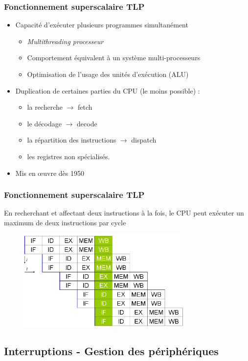 \begin{frame}
\frametitle{Fonctionnement superscalaire TLP}
\begin{itemize}
\item Capacité d'exécuter plusieurs programmes simultanément
\begin{itemize}
\item \textit{Multithreading processeur}
\item Comportement équivalent à un système multi-processeurs
\item Optimisation de l'usage des unités d'exécution (ALU)
\end{itemize}
\item Duplication de certaines parties du CPU (le moins possible) :
\begin{itemize}
\item la recherche $\rightarrow$ fetch
\item le décodage $\rightarrow$ decode
\item la répartition des instructions $\rightarrow$ dispatch
\item les registres non spécialisés.
\end{itemize}
\item Mis en œuvre dès 1950
\end{itemize}
\end{frame}

\begin{frame}
\frametitle{Fonctionnement superscalaire TLP}
En recherchant et affectant deux instructions à la fois, le CPU peut exécuter un maximum de deux instructions par cycle \cite{wp-cpu}
\begin{figure}
\includegraphics[height=5cm]{../illustration/Superscalarpipeline.png}
\end{figure}
\end{frame}


\subsection{Interruptions - Gestion des périphériques}

